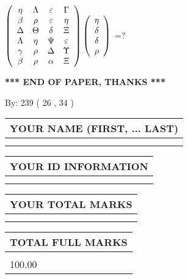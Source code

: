 \documentclass[12pt]{article}
\begin{document}
 
$  %
 \left( \begin{array}
 {
 c
 c
 c
 c
 }
 \eta & 
 \Lambda & 
 \varepsilon & 
 \Gamma \\ 
 \beta & 
 \rho & 
 \varepsilon & 
 \eta \\ 
 \Delta & 
 \Theta & 
 \delta & 
                    \Xi \\ 
 \Lambda & 
 \eta & 
 \Psi & 
 \varepsilon \\ 
 \gamma & 
 \rho & 
 \Delta & 
 \Upsilon \\ 
 \beta & 
 \rho & 
 \alpha & 
                    \Xi
 \end{array} \right)
 \left( \begin{array}
 {
 c
 }
 \eta \\ 
 \delta \\ 
 \delta \\ 
 \rho
 \end{array} \right)
$ =?
 

 

 
\vspace{0.3in}
   
   
 \vspace{0.2in}
 
   
   
   
   
\vspace{1.0in} 
{\textbf{\large{ *** END OF PAPER, THANKS *** }}} 
   
   
\hspace{1.0in} By: 
 239 ( 26 ,  34 )
   
   
   
   
\newpage 
\setcounter{page}{ 
    34001 } 
   
   
   
   
\noindent\begin{tabular}{|l|}
\hline
YOUR NAME (FIRST, ... LAST)  \\
\hline
 \\ 
 \\ 
\hline
\end{tabular}
\hspace{0.05in} \begin{tabular}{|l|}
\hline
 YOUR   ID   INFORMATION  \\
\hline
 \\ 
 \\ 
\hline
\end{tabular}
   
   
\vspace{0.2in}\noindent\begin{tabular}{|l|}
\hline
YOUR TOTAL MARKS  \\
\hline
 \\ 
 \\ 
\hline
\end{tabular}
\hspace{0.05in} \begin{tabular}{|l|}
\hline
TOTAL FULL MARKS  \\
\hline
 \\ 
100.00 \\
\hline
\end{tabular}
   
\end{document}
